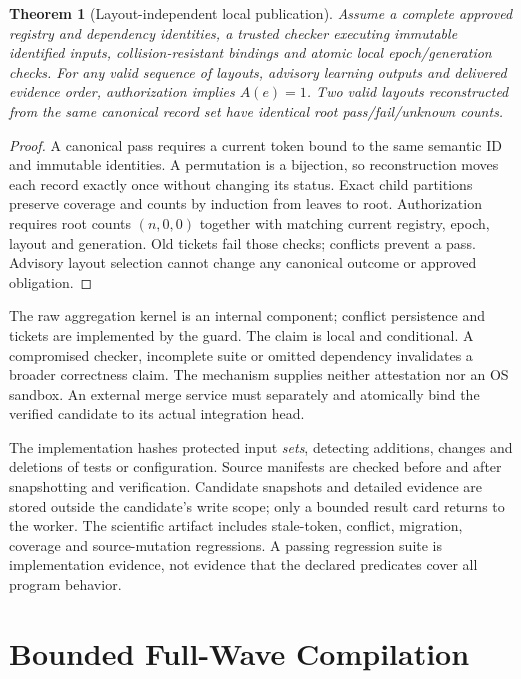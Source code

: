 \documentclass[preprint,12pt]{elsarticle}
\newtheorem{theorem}{Theorem}
\theoremstyle{definition}\newtheorem{definition}[theorem]{Definition}
\begin{document}
\begin{theorem}[Layout-independent local publication]\label{thm:jsafety}
Assume a complete approved registry and dependency identities, a trusted
checker executing immutable identified inputs, collision-resistant bindings
and atomic local epoch/generation checks. For any valid sequence of layouts,
advisory learning outputs and delivered evidence order, authorization implies
$A(e)=1$. Two valid layouts reconstructed from the same canonical record set
have identical root pass/fail/unknown counts.
\end{theorem}
\begin{proof}
A canonical pass requires a current token bound to the same semantic ID and
immutable identities. A permutation is a bijection, so reconstruction moves
each record exactly once without changing its status. Exact child partitions
preserve coverage and counts by induction from leaves to root. Authorization
requires root counts $(n,0,0)$ together with matching current registry, epoch,
layout and generation. Old tickets fail those checks; conflicts prevent a
pass. Advisory layout selection cannot change any canonical outcome or
approved obligation.
\end{proof}

The raw aggregation kernel is an internal component; conflict persistence
and tickets are implemented by the guard. The claim is local and conditional.
A compromised checker, incomplete suite or omitted dependency invalidates
a broader correctness claim. The mechanism supplies neither attestation nor
an OS sandbox. An external merge service must separately and atomically bind
the verified candidate to its actual integration head.

The implementation hashes protected input \emph{sets}, detecting additions,
changes and deletions of tests or configuration. Source manifests are checked
before and after snapshotting and verification. Candidate snapshots and
detailed evidence are stored outside the candidate's write scope; only a
bounded result card returns to the worker. The scientific artifact includes
stale-token, conflict, migration, coverage and source-mutation regressions.
A passing regression suite is implementation evidence, not evidence that the
declared predicates cover all program behavior.

\section{Bounded Full-Wave Compilation}\label{sec:jcompiler}
\end{document}
